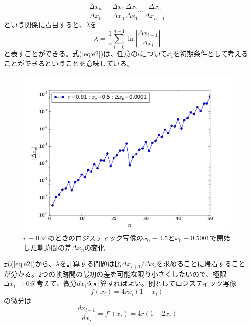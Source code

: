 \documentclass{jsarticle}
\begin{document}
        \begin{equation}
            \frac{\Delta x_{n}}{\Delta x_{0}}=\frac{\Delta x_{1}}{\Delta x_{0}}\frac{\Delta x_{2}}{\Delta x_{1}} \cdots 
            \frac{\Delta x_{n}}{\Delta x_{n-1}}
        \end{equation}
        という関係に着目すると、$\lambda$を
        \begin{equation}
            \lambda = \frac{1}{n}\sum_{i=0}^{n-1}\ln \left| \frac{\Delta x_{i+1}}{\Delta x_{i}} \right|
            \label{eq:e2}
        \end{equation}
        と表すことができる。式(\ref{eq:e2})は、任意の$i$について$x_{i}$を初期条件として考えることができるということを意味している。
        \begin{figure}[H]
            \begin{center}
                \includegraphics[width=12.5cm]{figure_test.pdf}
                \caption{$r=0.91$のときのロジスティック写像の$x_{0}=0.5$と$x_{0}=0.5001$で開始した軌跡間の差$\Delta x_{n}$の変化}
                \label{fig:f1}
            \end{center}
        \end{figure}
        式(\ref{eq:e2})から、$\lambda$を計算する問題は比$\Delta x_{i+1} / \Delta x_{i}$を求めることに帰着することが分かる。2つの軌跡間の最初の差を可能な限り小さくしたいので、極限$\Delta x_{i} \rightarrow 0$を考えて、微分$dx_{i}$を計算すればよい。例としてロジスティック写像
        \begin{equation}
            f(x_{i})=4rx_{i}(1-x_{i})
        \end{equation}
        の微分は
        \begin{equation}
            \frac{dx_{i+1}}{dx_{i}}=f'(x_{i})= 4r(1-2x_{i})
            \label{eq:e3}
        \end{equation}
\end{document}
